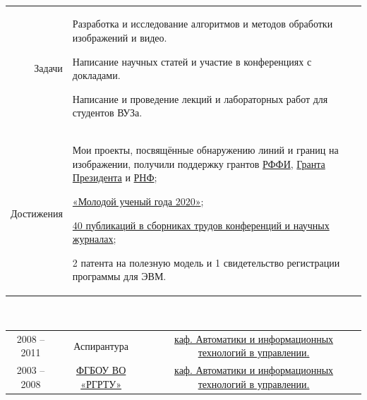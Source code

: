 \documentclass[11pt]{article}
\renewenvironment{itemize}{
	\begin{list}{\labelitemi}{
			\setlength{\topsep   }{0pt}
			\setlength{\partopsep}{0pt}
			\setlength{\parskip  }{0pt}
			\setlength{\parsep   }{0pt}
			\setlength{\itemsep  }{0pt}
		}
	}{\end{list}}
\begin{document}
		\\
		\begin{tabular} {r | p{}}
			Задачи &
			\begin{itemize}
				\item Разработка и исследование алгоритмов и методов обработки изображений и видео.
				\item Написание научных статей и участие в конференциях с докладами.
				\item Написание и проведение лекций и лабораторных работ для студентов ВУЗа.
			\end{itemize}
			\\
			Достижения &
			\begin{itemize}
				\item Мои проекты, посвящённые обнаружению линий и границ на изображении, получили поддержку грантов \href{https://www.rfbr.ru/project_search/350568/}{РФФИ}, \href{https://grants.extech.ru/grants/res/winners.php?OZ=9&TZ=K&year=2016}{Гранта Президента} и \href{http://rscf.ru/sites/default/files/docfiles/Winners_0029.pdf}{РНФ};
				\item \href{https://ryazan.bezformata.com/listnews/aspiranti-rgrtu-pobediteli-konkursa/81548415/}{«Молодой ученый года 2020»};
				\item \hyperlink{AutorIDs}{40 публикаций в сборниках трудов конференций и научных журналах};
				\item 2 патента на полезную модель и 1 свидетельство регистрации программы для ЭВМ.
			\end{itemize}
		\end{tabular}
	
	\newpage
	
	\\
	\begin{tabular} {c | c | c}
		2008 -- 2011 & Аспирантура & \href{http://www.rsreu.ru/faculties/faitu/kafedri/aitu}{каф. Автоматики и информационных технологий в управлении.}\\
		2003 -- 2008 & \href{http://www.rsreu.ru/}{ФГБОУ ВО «РГРТУ»} & \href{http://www.rsreu.ru/faculties/faitu/kafedri/aitu}{каф. Автоматики и информационных технологий в управлении.}\\
	\end{tabular}\\
\end{document}
